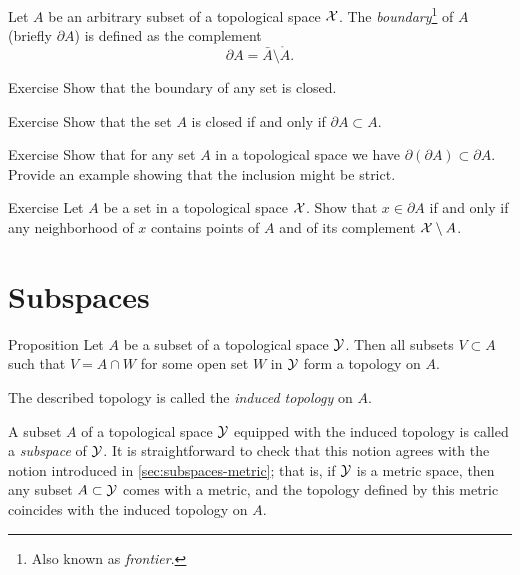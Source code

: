 Let $A$ be an arbitrary subset of a topological space $\mathcal{X}$.
The \emph{boundary}\footnote{Also known as \emph{frontier}.} of $A$ (briefly $\partial A$) is defined as the complement
\[\partial A=\bar A\setminus \mathring A.\]

\begin{thm}{Exercise}\label{ex:bry-closed}
Show that the boundary of any set is closed.
\end{thm}

\begin{thm}{Exercise}\label{ex:bry<closure}
Show that the set $A$ is closed if and only if $\partial A\subset A$.
\end{thm}

\begin{thm}{Exercise}\label{ex:bry-bry}
Show that for any set $A$ in a topological space we have $\partial(\partial A)\subset \partial A$.
Provide an example showing that the inclusion might be strict.
\end{thm}

\begin{thm}{Exercise}\label{ex:bry-nbhd}
Let $A$ be a set in a topological space $\mathcal{X}$.
Show that $x\in \partial A$ if and only if any neighborhood of $x$ contains points of $A$ and of its complement $\mathcal{X}\setminus A$.
\end{thm}

\section{Subspaces}\label{sec:induced-topology}

\begin{thm}{Proposition}\label{prop:subspace}
Let $A$ be a subset of a topological space $\mathcal{Y}$.
Then all subsets $V\subset A$ such that $V=A\cap W$ for some open set $W$ in $\mathcal{Y}$ form a topology on $A$.
\end{thm}

The described topology is called the \emph{induced topology} on $A$.

A subset $A$ of a topological space $\mathcal{Y}$ equipped with the induced topology is called a \emph{subspace} of $\mathcal{Y}$.
It is straightforward to check that this notion agrees with the notion introduced in \ref{sec:subspaces-metric};
that is, if $\mathcal{Y}$ is a metric space, then any subset $A\subset\mathcal{Y}$ comes with a metric,
and the topology defined by this metric coincides with the induced topology on $A$.

